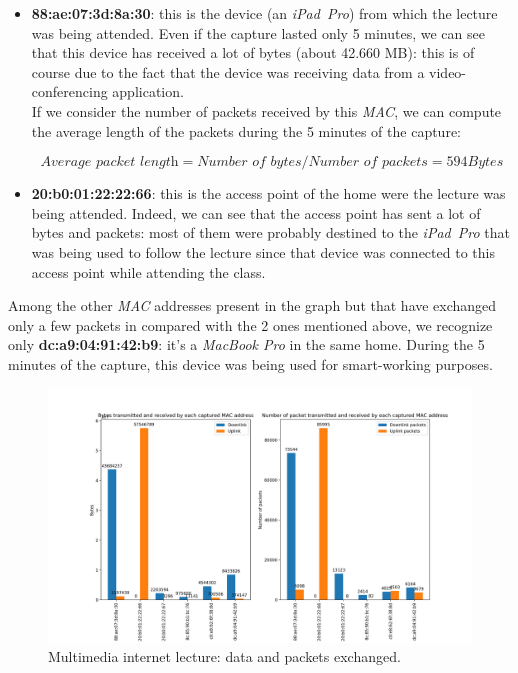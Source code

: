 \begin{itemize}
    \item \textbf{88:ae:07:3d:8a:30}: this is the device (an \textit{iPad\ Pro}) from which the lecture 
            was being attended. Even if the capture lasted only 5 minutes, we can see that this 
            device has received a lot of bytes (about 42.660 MB): this is of course due to the fact
            that the device was receiving data from a video-conferencing application.\\ 
            If we consider the number of packets received by this \textit{MAC}, we can compute the 
            average length of the packets during the 5 minutes of the capture:

            \begin{equation}
                \textit{Average packet length} = \textit{Number of bytes} / \textit{Number of packets} = 594 Bytes
            \end{equation}

    \item \textbf{20:b0:01:22:22:66}: this is the access point of the home were the lecture was being
            attended. Indeed, we can see that the access point has sent a lot of bytes and packets: 
            most of them were probably destined to the \textit{iPad\ Pro} that was being used to
            follow the lecture since that device was connected to this access point while attending 
            the class. 
\end{itemize}

Among the other \textit{MAC} addresses present in the graph but that have exchanged only a few 
packets in compared with the 2 ones mentioned above, we recognize only \textbf{dc:a9:04:91:42:b9}: 
it's a \textit{MacBook Pro} in the same home. During the 5 minutes of the capture, this device was 
being used for smart-working purposes.

\begin{figure}[h]
    \centering
    \includegraphics[width=\linewidth]{Graphs/Multimedia_internet_bytes_packets.png}
    \caption{Multimedia internet lecture: data and packets exchanged.}
    \label{fig:Multimedia internet lecture: data and packets exchanged.}
\end{figure}


